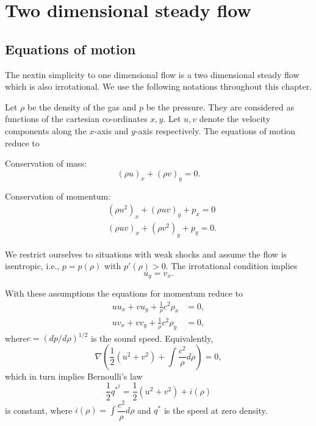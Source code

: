 
\chapter{Two dimensional steady flow}\label{chap3}

\section{Equations of motion}\label{chap3:sec3.1}
The next\pageoriginale in simplicity to one dimensional flow is a two dimensional steady flow which is also irrotational. We use the following notations throughout this chapter.

Let $\rho$ be the density of the gas and $p$ be the pressure. They are considered as functions of the cartesian co-ordinates $x,y$. Let $u,v$ denote the velocity components  along the $x$-axis and $y$-axis respectively. The equations of motion reduce to 

Conservation of mass:
\begin{equation*}
(\rho u)_x  + (\rho v)_y = 0. \tag{3.1}\label{eq3.1}
\end{equation*}

Conservation of momentum:
\begin{align*}
& (\rho u^2)_x +  (\rho uv)_y + p_x =  0 \tag{3.2a}\label{eq3.2a}\\
& (\rho u v)_x + (\rho v^2)_y + p_y = 0. \tag{3.2b}\label{eq3.2b}
\end{align*}

We restrict ourselves to situations with weak shocks and assume the flow is isentropic, i.e., $p=p(\rho)$ with $p'(\rho)>0$. The irrotational condition implies
\begin{equation*}
u_y = v_x. \tag{3.3}\label{eq3.3}
\end{equation*}

With these assumptions the equations for momentum reduce to 
\begin{align*}
 uu_x + vu_y + \frac{1}{\rho} c^2 \rho_x & = 0,\\
uv_x + vv_y + \frac{1}{\rho} c^2 \rho_y & = 0,
\end{align*}
where\pageoriginale $c = (dp/ d\rho)^{1/2}$ is the sound speed. Equivalently, 
$$
\nabla (\frac{1}{2} (u^2 + v^2) + \int \frac{c^2}{\rho} d\rho) = 0,
$$
which in turn implies Bernoulli's law
$$
\frac{1}{2} q^{*^2} = \frac{1}{2} (u^2 + v^2) + i(\rho)
$$
is constant, where $i(\rho) = \int \dfrac{c^2}{\rho} d\rho$ and $q^*$ is the speed at zero density.

